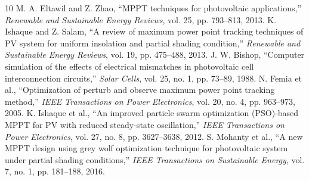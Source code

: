 \documentclass[final,3p,times,twocolumn]{elsarticle}
\begin{document}
\begin{thebibliography}{10}
 M. A. Eltawil and Z. Zhao, ``MPPT techniques for photovoltaic applications,'' \emph{Renewable and Sustainable Energy Reviews}, vol. 25, pp. 793--813, 2013.
 K. Ishaque and Z. Salam, ``A review of maximum power point tracking techniques of PV system for uniform insolation and partial shading condition,'' \emph{Renewable and Sustainable Energy Reviews}, vol. 19, pp. 475--488, 2013.
 J. W. Bishop, ``Computer simulation of the effects of electrical mismatches in photovoltaic cell interconnection circuits,'' \emph{Solar Cells}, vol. 25, no. 1, pp. 73--89, 1988.
 N. Femia et al., ``Optimization of perturb and observe maximum power point tracking method,'' \emph{IEEE Transactions on Power Electronics}, vol. 20, no. 4, pp. 963--973, 2005.
 K. Ishaque et al., ``An improved particle swarm optimization (PSO)-based MPPT for PV with reduced steady-state oscillation,'' \emph{IEEE Transactions on Power Electronics}, vol. 27, no. 8, pp. 3627--3638, 2012.
 S. Mohanty et al., ``A new MPPT design using grey wolf optimization technique for photovoltaic system under partial shading conditions,'' \emph{IEEE Transactions on Sustainable Energy}, vol. 7, no. 1, pp. 181--188, 2016.
\end{thebibliography}
\end{document}
